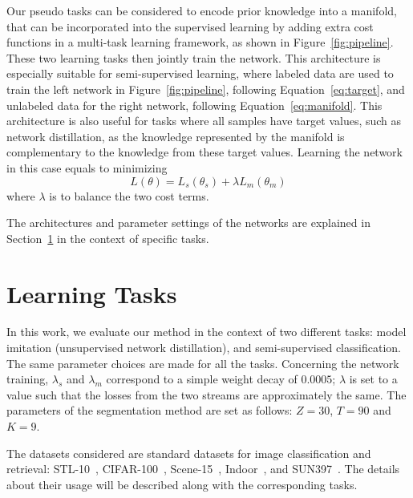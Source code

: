 \documentclass{bmvc2k}
\begin{document}
Our pseudo tasks can be considered to encode prior knowledge into a 
manifold, that can be incorporated into the supervised learning by adding 
extra cost functions in a multi-task learning framework, as shown in 
Figure~\ref{fig:pipeline}. These two learning tasks then jointly train 
the network. This architecture is especially suitable for semi-supervised 
learning, where labeled data are used to train the left network in Figure~\ref{fig:pipeline}, following Equation~\ref{eq:target}, 
and unlabeled data for the right network, following Equation~\ref{eq:manifold}. This architecture is also useful for tasks where 
all samples have target values, such as network distillation, as the knowledge represented by the manifold is 
complementary to the knowledge from these target values. 
Learning the network in this case equals to minimizing 
\begin{equation}
\label{eq:cost} 
L(\theta) =  L_s(\theta_s) + \lambda L_m(\theta_m)
\end{equation}
where $\lambda$ is to balance the two cost terms. 

The architectures and parameter settings of 
the networks are explained in Section~\ref{sec:tasks} in the context of 
specific tasks. 




\section{Learning Tasks} 
\label{sec:tasks}


In this work, we evaluate our method in the context of two
different tasks: model imitation (unsupervised network distillation), and semi-supervised classification. The same parameter
choices are made for all the tasks. Concerning the network training,
$\lambda_s$ and $\lambda_m$ correspond to a simple weight decay of $0.0005$;
$\lambda$ is set to a value such that the losses from the two
streams are approximately the same. The parameters of the segmentation
method are set as follows: $Z=30$, $T=90$ and $K=9$. 

The datasets considered are standard datasets for image classification
and retrieval: 
STL-10~\cite{stl-10},  CIFAR-100~\cite{cifar}, Scene-15~\cite{lazebnik:cvpr06}, Indoor~\cite{Indoor}, and SUN397~\cite{SUN397}. The details about
their usage will be described along with the corresponding tasks.




  
 
\end{document}

